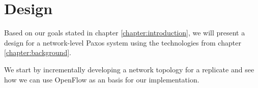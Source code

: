 \chapter{Design}
\label{chapter:design}

Based on our goals stated in chapter \ref{chapter:introduction}, we will
present a design for a network-level Paxos system using the technologies
from chapter \ref{chapter:background}.

We start by incrementally developing a network topology for a replicate and
see how we can use OpenFlow as an basis for our implementation.





